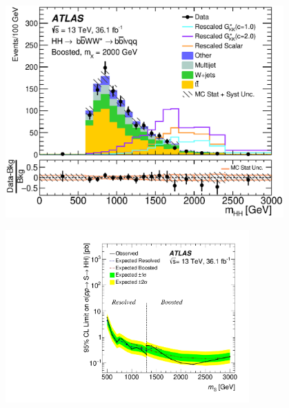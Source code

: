 \documentclass{beamer}
\newcommand*{\header}[1]{\fontsize{16}{8}\selectfont \textbf{{\color{MyPurple}{#1}}}}
\begin{document}
\begin{frame}
\begin{center}
\header{Results}
\end{center}
\begin{center}
\includegraphics[width=0.8\textwidth]{figures/C_2tab_0bjet_SR_lepton_presel_met50_hhMassRebin1_postfit}
\end{center}
\end{frame}

\begin{frame}
\begin{center}
\header{Combined Limit}
\end{center}
\begin{center}
\includegraphics[width=0.7\textwidth]{figures/limit_2016_reOpt_HiggsApproved_Scalar_Paper_Combined_20190312_01}
\end{center}
\end{frame}
\end{document}
